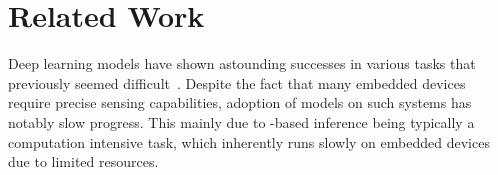 \section{Related Work}
Deep learning models have shown astounding successes in various tasks that previously seemed difficult~\cite{cho2014learning}. Despite the
fact that many embedded devices require precise sensing capabilities, adoption of \DNN models on such systems has notably slow progress.
This mainly due to \DNN-based inference being typically a computation intensive task, which inherently runs slowly on embedded devices due
to limited resources.

%


